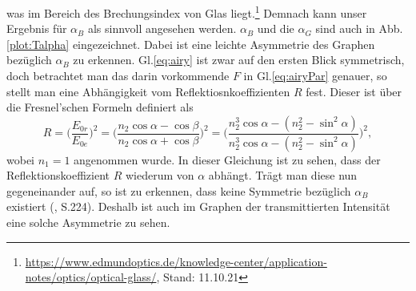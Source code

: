 was im Bereich des Brechungsindex von Glas liegt.\footnote{\url{https://www.edmundoptics.de/knowledge-center/application-notes/optics/optical-glass/}, Stand: 11.10.21} 
Demnach kann unser Ergebnis für $\alpha_B$ als sinnvoll angesehen werden.
$\alpha_B$ und die $\alpha_G$ sind auch in Abb.\ref{plot:Talpha} eingezeichnet. Dabei ist eine leichte Asymmetrie des Graphen bezüglich $\alpha_B$ zu erkennen. Gl.\ref{eq:airy} ist zwar auf den 
ersten Blick symmetrisch, doch betrachtet man das darin vorkommende $F$ in Gl.\ref{eq:airyPar} genauer, so stellt man eine Abhängigkeit vom Reflektiosnkoeffizienten $R$ fest. 
Dieser ist über die Fresnel'schen Formeln definiert als 
\begin{equation*}
    R =\biggl (\frac{E_{0r}}{E_{0e}} \biggl)^2 = \biggl(\frac{n_2\cos\alpha - \cos\beta}{n_2\cos\alpha + \cos\beta} \biggl)^2 = \biggl(\frac{n_2^3\cos\alpha - (n_2^2-\sin^2\alpha)}{n_2^3\cos\alpha - (n_2^2-\sin^2\alpha)} \biggl)^2,
\end{equation*}
wobei $n_1 = 1$ angenommen wurde. In dieser Gleichung ist zu sehen, dass der Reflektionskoeffizient $R$ wiederum von $\alpha$ abhängt. Trägt man diese nun gegeneinander auf, so ist zu erkennen, dass keine 
Symmetrie bezüglich $\alpha_B$ existiert (\cite{Demtroeder2017}, S.224). Deshalb ist auch im Graphen der transmittierten Intensität eine solche Asymmetrie zu sehen.


